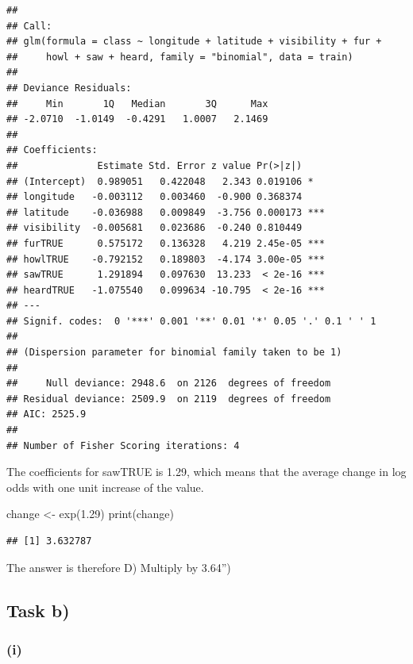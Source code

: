 \documentclass[
]{article}
\newenvironment{Shaded}{\begin{snugshade}}{\end{snugshade}}
\newcommand{\FloatTok}[1]{\textcolor[rgb]{0.00,0.00,0.81}{#1}}
\newcommand{\FunctionTok}[1]{\textcolor[rgb]{0.00,0.00,0.00}{#1}}
\newcommand{\NormalTok}[1]{#1}
\newcommand{\OtherTok}[1]{\textcolor[rgb]{0.56,0.35,0.01}{#1}}
\begin{document}
\begin{verbatim}
## 
## Call:
## glm(formula = class ~ longitude + latitude + visibility + fur + 
##     howl + saw + heard, family = "binomial", data = train)
## 
## Deviance Residuals: 
##     Min       1Q   Median       3Q      Max  
## -2.0710  -1.0149  -0.4291   1.0007   2.1469  
## 
## Coefficients:
##              Estimate Std. Error z value Pr(>|z|)    
## (Intercept)  0.989051   0.422048   2.343 0.019106 *  
## longitude   -0.003112   0.003460  -0.900 0.368374    
## latitude    -0.036988   0.009849  -3.756 0.000173 ***
## visibility  -0.005681   0.023686  -0.240 0.810449    
## furTRUE      0.575172   0.136328   4.219 2.45e-05 ***
## howlTRUE    -0.792152   0.189803  -4.174 3.00e-05 ***
## sawTRUE      1.291894   0.097630  13.233  < 2e-16 ***
## heardTRUE   -1.075540   0.099634 -10.795  < 2e-16 ***
## ---
## Signif. codes:  0 '***' 0.001 '**' 0.01 '*' 0.05 '.' 0.1 ' ' 1
## 
## (Dispersion parameter for binomial family taken to be 1)
## 
##     Null deviance: 2948.6  on 2126  degrees of freedom
## Residual deviance: 2509.9  on 2119  degrees of freedom
## AIC: 2525.9
## 
## Number of Fisher Scoring iterations: 4
\end{verbatim}

The coefficients for sawTRUE is 1.29, which means that the average
change in log odds with one unit increase of the value.

\begin{Shaded}
\begin{Highlighting}[]
\NormalTok{change }\OtherTok{\textless{}{-}} \FunctionTok{exp}\NormalTok{(}\FloatTok{1.29}\NormalTok{)}
\FunctionTok{print}\NormalTok{(change)}
\end{Highlighting}
\end{Shaded}

\begin{verbatim}
## [1] 3.632787
\end{verbatim}

The answer is therefore D) Multiply by 3.64'')

\hypertarget{task-b}{%
\subsection{Task b)}\label{task-b}}

\hypertarget{i-2}{%
\subsubsection{(i)}\label{i-2}}
\end{document}
